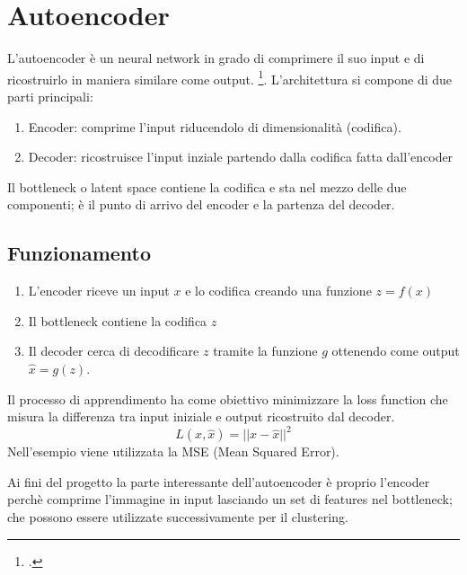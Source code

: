 \section{Autoencoder}
L'autoencoder è un neural network in grado di comprimere il suo input e di ricostruirlo in maniera similare come output. \footcite[p.~499]{Goodfellow-et-al-2016}.
L'architettura si compone di due parti principali:
\begin{enumerate}
    \item Encoder: comprime l'input riducendolo di dimensionalità (codifica).
    \item Decoder: ricostruisce l'input inziale partendo dalla codifica fatta dall'encoder
\end{enumerate}
Il bottleneck o latent space contiene la codifica e sta nel mezzo delle due componenti; è il punto di arrivo del encoder e la partenza del decoder.

\subsection{Funzionamento}
\begin{enumerate}
    \item L'encoder riceve un input \( x \) e lo codifica creando una funzione \( z= f(x) \)
    \item Il bottleneck contiene la codifica \( z \)
    \item Il decoder cerca di decodificare \( z \) tramite la funzione \( g \) ottenendo come output \( \hat{x} = g(z) \).
\end{enumerate}

Il processo di apprendimento ha come obiettivo minimizzare la loss function che misura la differenza tra input iniziale e output ricostruito dal decoder.
\[ L(x, \hat{x}) = ||x - \hat{x}||^2 \]
Nell'esempio viene utilizzata la MSE (Mean Squared Error).

Ai fini del progetto la parte interessante dell'autoencoder è proprio l'encoder perchè comprime l'immagine in input lasciando un set di features nel bottleneck; che possono essere utilizzate successivamente per il clustering.







